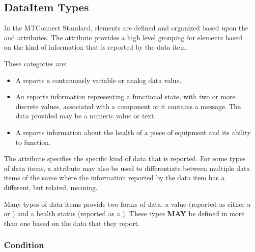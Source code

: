 \subsection{DataItem Types} \label{sec:DataItemTypes}


In the MTConnect Standard,  elements are defined and organized based upon the  and  attributes.  The  attribute provides a high level grouping for  elements based on the kind of information that is reported by the data item.

These categories are:

\begin{itemize}

\item {}

A  reports a continuously variable or analog data value. 

\item {}

An  reports information representing a functional state, with two or more discrete values, associated with a component or it contains a message.  The data provided may be a numeric value or text.

\item {}

A  reports information about the health of a piece of equipment and its ability to function.
\end{itemize}

The  attribute specifies the specific kind of data that is reported.   For some types of data items, a  attribute may also be used to differentiate between multiple data items of the same  where the information reported by the data item has a different, but related, meaning.

Many types of data items provide two forms of data: a value (reported as either a  or ) and a health status (reported as a ).  These  types \textbf{MAY} be defined in more than one  based on the data that they report.



\subsubsection{Condition}
  \label{sec:Condition}



